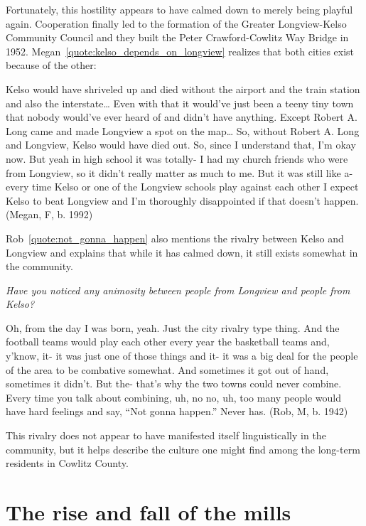 Fortunately, this hostility appears to have calmed down to merely being playful again. Cooperation finally led to the formation of the Greater Longview-Kelso Community Council and they built the Peter Crawford-Cowlitz Way Bridge in 1952. Megan~\ref{quote:kelso_depends_on_longview} realizes that both cities exist because of the other:
\begin{num_quote}
    Kelso would have shriveled up and died without the airport and the train station and also the interstate… Even with that it would've just been a teeny tiny town that nobody would've ever heard of and didn't have anything. Except Robert A. Long came and made Longview a spot on the map… So, without Robert A. Long and Longview, Kelso would have died out. So, since I understand that, I'm okay now. But yeah in high school it was totally- I had my church friends who were from Longview, so it didn't really matter as much to me. But it was still like a- every time Kelso or one of the Longview schools play against each other I expect Kelso to beat Longview and I'm thoroughly disappointed if that doesn't happen. (Megan, F, b. 1992)
    \label{quote:kelso_depends_on_longview}
\end{num_quote}
Rob~\ref{quote:not_gonna_happen} also mentions the rivalry between Kelso and Longview and explains that while it has calmed down, it still exists somewhat in the community.
\begin{num_quote}
\textit{Have you noticed any animosity between people from Longview and people from Kelso?}

Oh, from the day I was born, yeah. Just the city rivalry type thing. And the football teams would play each other every year the basketball teams and, y'know, it- it was just one of those things and it- it was a big deal for the people of the area to be combative somewhat. And sometimes it got out of hand, sometimes it didn't. But the- that's why the two towns could never combine. Every time you talk about combining, uh, no no, uh, too many people would have hard feelings and say, ``Not gonna happen.'' Never has. (Rob, M, b. 1942)
\label{quote:not_gonna_happen}
\end{num_quote}
This rivalry does not appear to have manifested itself linguistically in the community, but it helps describe the culture one might find among the long-term residents in Cowlitz County.






\section{The rise and fall of the mills}
\label{sec:rise_and_fall}

